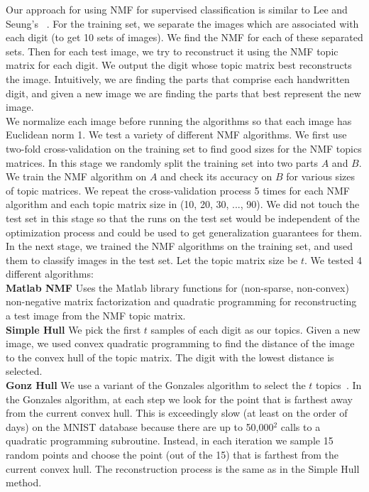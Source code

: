 \documentclass[12pt]{report}
\theoremstyle{definition}
\theoremstyle{lemma}
\theoremstyle{theorem}
\theoremstyle{corollary}
\begin{document}
Our approach for using NMF for supervised classification is similar to Lee and Seung's ~\cite{Lee97unsupervisedlearning}. For the training set, we separate the images which are associated with each digit (to get 10 sets of images). We find the NMF for each of these separated sets. Then for each test image, we try to reconstruct it using the NMF topic matrix for each digit. We output the digit whose topic matrix best reconstructs the image. Intuitively, we are finding the parts that comprise each handwritten digit, and given a new image we are finding the parts that best represent the new image.
\\

We normalize each image before running the algorithms so that each image has Euclidean norm 1. We test a variety of different NMF algorithms. We first use two-fold cross-validation on the training set to find good sizes for the NMF topics matrices. In this stage we randomly split the training set into two parts $A$ and $B$. We train the NMF algorithm on $A$ and check its accuracy on $B$ for various sizes of topic matrices. We repeat the cross-validation process 5 times for each NMF algorithm and each topic matrix size in (10, 20, 30, ..., 90). We did not touch the test set in this stage so that the runs on the test set would be independent of the optimization process and could be used to get generalization guarantees for them.
\\

In the next stage, we trained the NMF algorithms on the training set, and used them to classify images in the test set. Let the topic matrix size be $t$. We tested 4 different algorithms:
\\

\textbf{Matlab NMF} Uses the Matlab library functions for (non-sparse, non-convex) non-negative matrix factorization and quadratic programming for reconstructing a test image from the NMF topic matrix.
\\

\textbf{Simple Hull} We pick the first $t$ samples of each digit as our topics. Given a new image, we used convex quadratic programming to find the distance of the image to the convex hull of the topic matrix. The digit with the lowest distance is selected.
\\

\textbf{Gonz Hull} We use a variant of the Gonzales algorithm to select the $t$ topics~\cite{blum-peled}. In the Gonzales algorithm, at each step we look for the point that is farthest away from the current convex hull. This is exceedingly slow (at least on the order of days) on the MNIST database because there are up to 50,000$^2$ calls to a quadratic programming subroutine. Instead, in each iteration we sample 15 random points and choose the point (out of the 15) that is farthest from the current convex hull. The reconstruction process is the same as in the Simple Hull method.
\\
\end{document}
